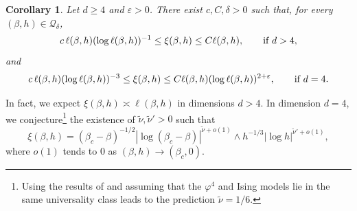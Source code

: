 \documentclass[11pt,a4paper]{article}
\numberwithin{equation}{section}
\theoremstyle{plain}
\newtheorem{Coro}[Thm]{Corollary}
\theoremstyle{definition}
\begin{document}
\begin{Coro}\label{coro:correlation length intro}
Let $d\geq 4$ and $\varepsilon>0$. There exist $c,C,\delta>0$ such that, for every $(\beta,h)\in \mathcal Q_\delta$,
\begin{equation}\label{eq:correlation length bounds intro}
    c\,\ell(\beta,h)(\log\ell(\beta,h))^{-1}
    \leq \xi(\beta,h)\leq C\ell(\beta,h), \qquad \textup{if }d>4,
\end{equation}
and 
\begin{equation}\label{eq:correlation length bounds intro bis}
    c\,\ell(\beta,h)(\log\ell(\beta,h))^{-3}
    \leq \xi(\beta,h)\leq C\ell(\beta,h)(\log \ell(\beta,h))^{2+\varepsilon}, \qquad \textup{if }d=4.
\end{equation}
\end{Coro}
In fact, we expect $\xi(\beta,h)\asymp \ell(\beta,h)$ in dimensions $d>4$. In dimension $d=4$, we conjecture\footnote{Using the results of \cite{bauerschmidt2017finite} 
and assuming that the $\varphi^4$ and Ising models lie in the 
same universality class leads to the prediction $\tilde{\nu}=1/6$.} the existence of $\tilde \nu,\tilde \nu'>0$ such that 
\begin{equation}
	\xi(\beta,h)=(\beta_c-\beta)^{-1/2}|\log (\beta_c-\beta)|^{\tilde \nu+o(1)}\wedge h^{-1/3}|\log h|^{\tilde \nu'+o(1)},
	\end{equation}
	where $o(1)$ tends to $0$ as $(\beta,h)\to (\beta_c,0)$. 
	
\end{document}
